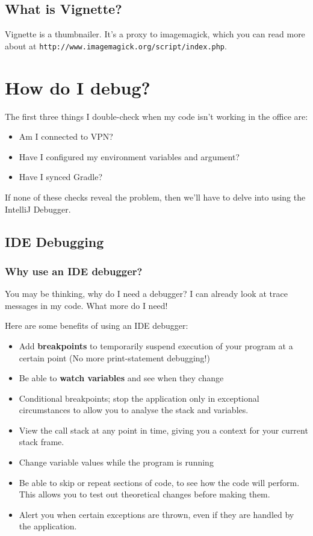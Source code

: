 \documentclass[oneside]{book}
\begin{document}
\section{What is Vignette?}
Vignette is a thumbnailer. It's a proxy to imagemagick, which you can read more about at \texttt{http://www.imagemagick.org/script/index.php}.
\chapter{How do I debug?}
The first three things I double-check when my code isn't working in the office are:
\begin{itemize}
	\item Am I connected to VPN?
	\item Have I configured my environment variables and argument?
	\item Have I synced Gradle?
\end{itemize}
If none of these checks reveal the problem, then we'll have to delve into using the IntelliJ Debugger.
\section{IDE Debugging}
\subsection{Why use an IDE debugger?}
You may be thinking, why do I need a debugger? I can already look at trace messages in my code. What more do I need!\par
Here are some benefits of using an IDE debugger:
\begin{itemize}
	\item Add \textbf{breakpoints} to temporarily suspend execution of your program at a certain point (No more print-statement debugging!)
	\item Be able to  \textbf{watch variables} and see when they change
	\item Conditional breakpoints; stop the application only in exceptional circumstances to allow you to analyse the stack and variables.
	\item View the call stack at any point in time, giving you a context for your current stack frame.
	\item Change variable values while the program is running
	\item Be able to skip or repeat sections of code, to see how the code will perform. This allows you to test out theoretical changes before making them.
	\item Alert you when certain exceptions are thrown, even if they are handled by the application.
\end{itemize}
\end{document}
